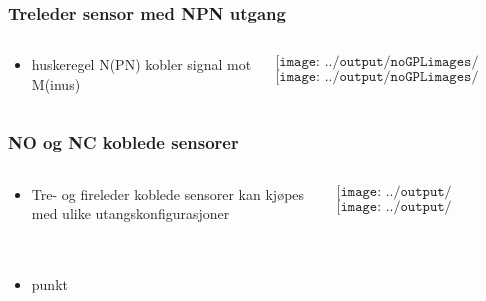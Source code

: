 \documentclass[aspectratio=169,xcolor=dvipsnames]{beamer}
\begin{document}
\begin{frame}
	\frametitle{Treleder sensor med NPN utgang}
	\begin{columns}
		\begin{column}{0.5\textwidth}
			\begin{itemize}
				\item huskeregel N(PN) kobler signal mot M(inus)
			\end{itemize}

			
		\end{column}

		\begin{column}{0.5\textwidth}
	$$\texttt{[image: ../output/noGPLimages/limit48.png]}$$
	$$\texttt{[image: ../output/noGPLimages/limit49.png]}$$
		\end{column}
	\end{columns}
\end{frame}
\begin{frame}
	\frametitle{NO og NC koblede sensorer}
	\begin{columns}
		\begin{column}{0.5\textwidth}
			\begin{itemize}
				\item Tre- og fireleder koblede sensorer kan kjøpes med ulike utangskonfigurasjoner
			\end{itemize}

			
		\end{column}

		\begin{column}{0.5\textwidth}
	$$\texttt{[image: ../output/noGPLimages/limit50.png]}$$
	$$\texttt{[image: ../output/noGPLimages/limit51.png]}$$
		\end{column}
	\end{columns}
\end{frame}
\begin{frame}
	\frametitle{}
	\begin{columns}
		\begin{column}{0.5\textwidth}
			\begin{itemize}
				\item punkt
			\end{itemize}

			
		\end{column}

		\begin{column}{0.5\textwidth}
		\end{column}
	\end{columns}
\end{frame}
%
\end{document}
